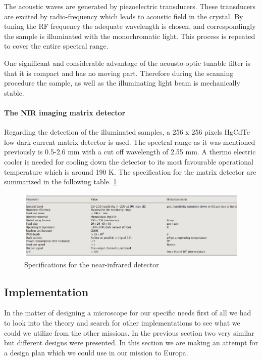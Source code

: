 The acoustic waves are generated by piezoelectric transducers. These transducers are excited by radio-frequency which leads to acoustic field in the crystal. By tuning the RF frequency the adequate wavelength is chosen, and correspondingly the sample is illuminated with the monochromatic light. This process is repeated to cover the entire spectral range.

One significant and considerable advantage of the acousto-optic tunable filter is that it is compact and has no moving part. Therefore during the scanning procedure the sample, as well as the illuminating light beam is mechanically stable.

\paragraph{The NIR imaging matrix detector}
Regarding the detection of the illuminated samples, a 256 x 256 pixels HgCdTe low dark current matrix detector is used. The spectral range as it was mentioned previously is 0.5-2.6 mm with a cut off wavelength of 2.55 mm.
A thermo electric cooler is needed for cooling down the detector to its most favourable operational temperature which is around 190 K. The specification for the matrix detector are summarized in the following table.
\ref{fig:Specs_for_NIR_detector_MicrOmega}

\begin{figure}[htb]
  \centering
  \includegraphics[scale=0.6]{figures/BFfig/Specs_for_NIR_detector_MicrOmega}
  \caption{Specifications for the near-infrared detector}
  \label{fig:Specs_for_NIR_detector_MicrOmega}
\end{figure}


\subsection{Implementation}
In the matter of designing a microscope for our specific needs first of all we had to look into the theory and search for other implementations to see what we could we utilize from the other missions. In the previous section two very similar but different designs were presented. In this section we are making an attempt for a design plan which we could use in our mission to Europa.

